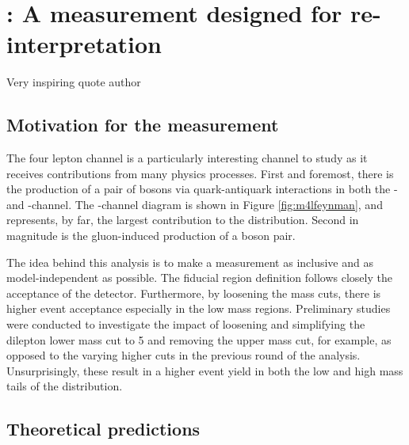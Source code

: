 \chapter{\mFourL: A measurement designed for re-interpretation}
\label{chap:fourlepton}

{Very inspiring quote author}

\section{Motivation for the \mFourL measurement}
\label{sec:fourlepmotivation}

The four lepton channel is a particularly interesting channel to study as it receives contributions from many physics processes. First and foremost, there is the production of a pair of \PZ bosons via quark-antiquark interactions in  both the \Ptop- and \Pup-channel. The \Ptop-channel diagram is shown in Figure \ref{fig:m4lfeynman}, and represents, by far,  the largest contribution to the \mFourL distribution. Second in magnitude is the gluon-induced production of a \PZ boson pair. 

The idea behind this analysis is to make a measurement as inclusive and as model-independent as possible. The fiducial region definition follows closely the acceptance of the detector. Furthermore, by loosening the mass cuts, there is higher event acceptance especially in the low mass regions. Preliminary studies were conducted to investigate the impact of loosening and simplifying the dilepton lower mass cut to \unit{5}{\GeV} and removing the upper mass cut, for example, as opposed to the varying higher cuts in the previous round of the analysis. Unsurprisingly, these result in a higher event yield in both the low and high mass tails of the \mFourL distribution. 


\section{Theoretical predictions}
\label{sec:theory}

